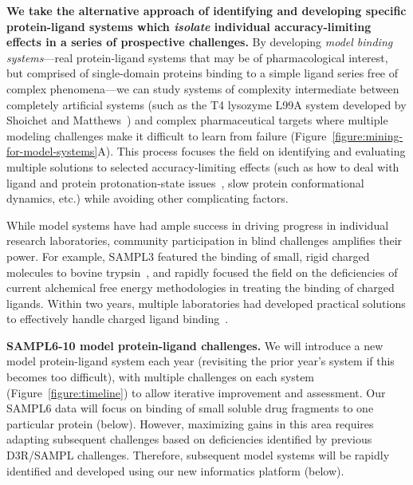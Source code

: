\documentclass[11pt]{article}
\begin{document}
{\bf We take the alternative approach of identifying and developing specific protein-ligand systems which \emph{isolate} individual accuracy-limiting effects in a series of prospective challenges.}
By developing \emph{model binding systems}---real protein-ligand systems that may be of pharmacological interest, but comprised of single-domain proteins binding to a simple ligand series free of complex phenomena---we can study systems of complexity intermediate between completely artificial systems (such as the T4 lysozyme L99A system developed by Shoichet and Matthews~\cite{mobley_predicting_2007,merski_homologous_2015, mobley_predicting_2016}) and complex pharmaceutical targets where multiple modeling challenges make it difficult to learn from failure (Figure~\ref{figure:mining-for-model-systems}A).
This process focuses the field on identifying and evaluating multiple solutions to selected accuracy-limiting effects (such as how to deal with ligand and protein protonation-state issues~\cite{Onufriev:2013:QuarterlyReviewsofBiophysics}, slow protein conformational dynamics, etc.) while avoiding other complicating factors.

While model systems have had ample success in driving progress in individual research laboratories, community participation in blind challenges amplifies their power.
For example, SAMPL3 featured the binding of small, rigid charged molecules to bovine trypsin~\cite{Newman:2011:JComputAidedMolDes}, and rapidly focused the field on the deficiencies of current alchemical free energy methodologies in treating the binding of charged ligands.
Within two years, multiple laboratories had developed practical solutions to effectively handle charged ligand binding~\cite{Rocklin:2013:TheJournalofChemicalPhysics, lin_overview_2014, Reif:2014:JournalofComputationalChemistry}.

\textbf{SAMPL6-10 model protein-ligand challenges.} 
We will introduce a new model protein-ligand system each year (revisiting the prior year's system if this becomes too difficult), with multiple challenges on each system (Figure~\ref{figure:timeline}) to allow iterative improvement and assessment.
Our SAMPL6 data will focus on binding of small soluble drug fragments to one particular protein (below). 
However, maximizing gains in this area requires adapting subsequent challenges based on deficiencies identified by previous D3R/SAMPL challenges.
Therefore, subsequent model systems will be rapidly identified and developed using our new informatics platform (below).
\end{document}
